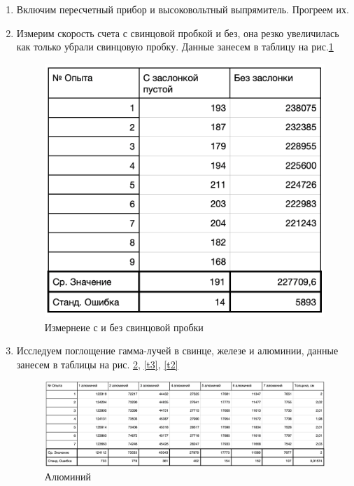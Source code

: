 \documentclass[a4paper]{article}
\begin{document}
\begin{enumerate}
    \item  Включим пересчетный прибор и высоковольтный выпрямитель. Прогреем их.
    

    \item Измерим скорость счета с свинцовой пробкой и без, она резко увеличилась как только убрали свинцовую пробку.
    Данные занесем в таблицу на рис.\ref{t4}

    \begin{figure}[H]
        \begin{center}
        \includegraphics[scale = 0.42]{t4.png}
        \caption{Измернеие с и без свинцовой пробки}
        \label{t4}
        \end{center}
    \end{figure}


    \item Исследуем поглощение гамма-лучей в свинце, железе и алюминии, данные занесем в таблицы
    на рис. \ref{t1}, \ref{t3}, \ref{t2}

    \begin{figure}[H]
        \begin{center}
        \includegraphics[scale = 0.4]{t1.png}
        \caption{Алюминий}
        \label{t1}
        \end{center}
    \end{figure}


\end{enumerate}
\end{document}
